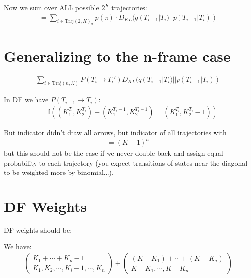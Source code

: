 \documentclass[11pt]{article}
\begin{document}
Now we sum over ALL possible $2^K$ trajectories:
\begin{align}
= \sum_{i \in \text{Traj}(2,K)_\pi} p(\pi) \cdot D_{KL}(q(T_{i-1} | T_i) || p(T_{i-1} | T_i))
\end{align}

\section{Generalizing to the n-frame case}

\begin{align}
\sum_{i \in \text{Traj}(n,K)} P(T_i \rightarrow T_i') D_{KL}(q(T_{i-1} | T_i) || p(T_{i-1} | T_i))
\end{align}

In DF we have $P(T_{i-1} \rightarrow T_i)$:
\begin{align}
= \mathbb{I}\left( \left( K_1^{T_i}, K_2^{T_i} \right) - \left( K_1^{T_i-1}, K_2^{T_i-1} \right) = \left( K_1^{T_i}, K_2^{T_i} - 1 \right) \right)
\end{align}

But indicator didn't draw all arrows, but indicator of all trajectories with
\begin{align}
= (K-1)^n
\end{align}
but this should not be the case if we never double back and assign equal probability to each trajectory (you expect transitions of states near the diagonal to be weighted more by binomial...).

\section{DF Weights}

DF weights should be:

\begin{center}
\end{center}

We have:
\begin{align}
\begin{pmatrix}
K_1 + \cdots + K_n - 1 \\
K_1, K_2, \cdots, K_i - 1, \cdots, K_n
\end{pmatrix} + \begin{pmatrix}
(K - K_1) + \cdots + (K - K_n) \\
K - K_1, \cdots, K - K_n
\end{pmatrix}
\end{align}
\end{document}
